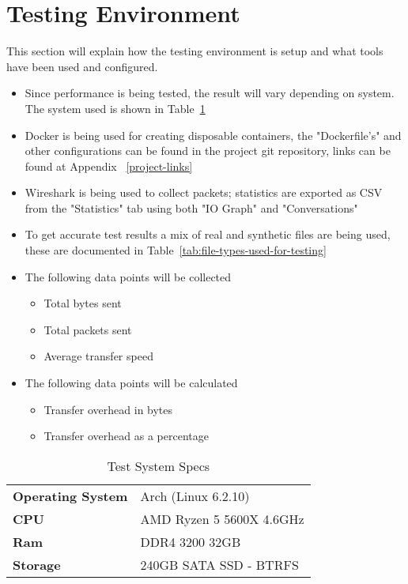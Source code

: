 \section{Testing Environment}
This section will explain how the testing environment is setup and what tools have been used and configured.

\begin{itemize}
	\item Since performance is being tested, the result will vary depending on system. The system used is shown in Table~\ref{tab:test-system-specs}
    \item Docker is being used for creating disposable containers, the "Dockerfile's" and other configurations can be found in the project git repository, links can be found at Appendix~ \ref{project-links}
	\item Wireshark is being used to collect packets; statistics are exported as CSV from the "Statistics" tab using both "IO Graph" and "Conversations"
	\item To get accurate test results a mix of real and synthetic files are being used, these are documented in Table~\ref{tab:file-types-used-for-testing}
	\item The following data points will be collected
	      \begin{itemize}
		      \item Total bytes sent
		      \item Total packets sent
		      \item Average transfer speed
	      \end{itemize}
	\item The following data points will be calculated
	      \begin{itemize}
		      \item Transfer overhead in bytes
		      \item Transfer overhead as a percentage
	      \end{itemize}
\end{itemize}

\begin{table}[h!]
	\caption{Test System Specs}
	\label{tab:test-system-specs}
	\centering
	\begin{tabular}{ l | l | }
		\textbf{Operating System} & Arch (Linux 6.2.10)      \\
		\textbf{CPU}              & AMD Ryzen 5 5600X 4.6GHz \\
		\textbf{Ram}              & DDR4 3200 32GB           \\
		\textbf{Storage}          & 240GB SATA SSD - BTRFS   \\
	\end{tabular}
\end{table}

